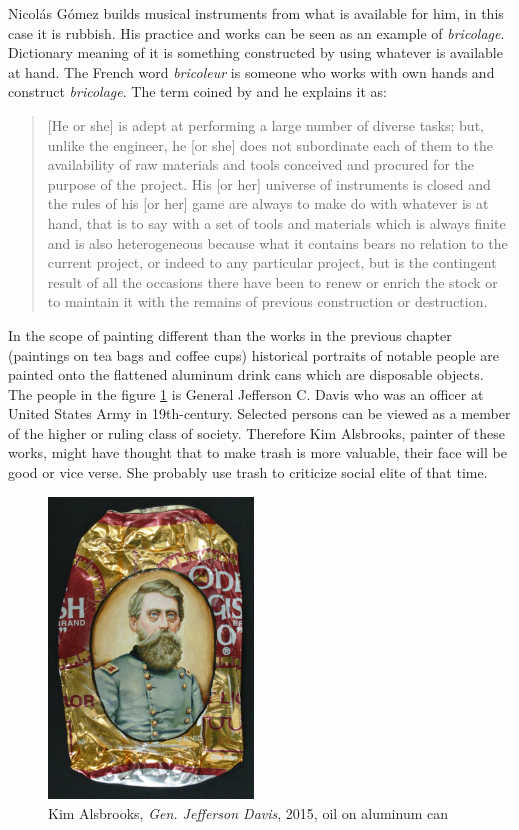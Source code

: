 Nicolás Gómez builds musical instruments from what is available for him, in this case it is rubbish. His practice and works can be seen as an example of \textit{bricolage}. Dictionary meaning of it is something constructed by using whatever is available at hand. The French word \textit{bricoleur} is someone who works with own hands and construct \textit{bricolage}. The term coined by \cite[17]{levi1966savage} and he explains it as:

\begin{quote}
[He or she] is adept at performing a large number of diverse tasks; but, unlike the engineer, he [or she] does not subordinate each of them to the availability of raw materials and tools conceived and procured for the purpose of the project. His [or her] universe of instruments is closed and the rules of his [or her] game are always to make do with whatever is at hand, that is to say with a set of tools and materials which is always finite and is also heterogeneous because what it contains bears no relation to the current project, or indeed to any particular project, but is the contingent result of all the occasions there have been to renew or enrich the stock or to maintain it with the remains of previous construction or destruction. 
\end{quote}

In the scope of painting different than the works in the previous chapter (paintings on tea bags and coffee cups) historical portraits of notable people are painted onto the flattened aluminum drink cans which are disposable objects. The people in the figure \ref{fig:Alsbrooks} is General Jefferson C. Davis who was an officer at United States Army in 19th-century. Selected persons can be viewed as a member of the higher or ruling class of society. Therefore Kim Alsbrooks, painter of these works, might have thought that to make trash is more valuable, their face will be good or vice verse. She probably use trash to criticize social elite of that time. 

\begin{figure}[h!]
  \centering
  \includegraphics[height=8cm]{graphics/Alsbrooks.jpg}
  \caption{Kim Alsbrooks, \textit{Gen. Jefferson Davis}, 2015, oil on aluminum can}
  \label{fig:Alsbrooks}
\end{figure}

